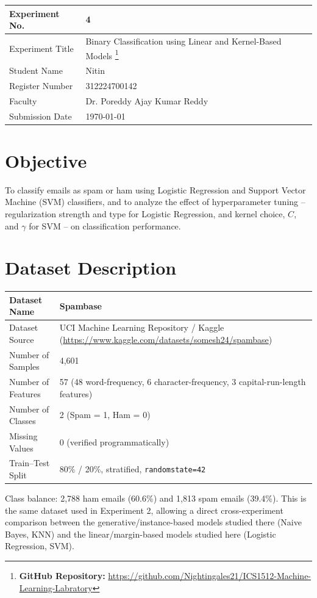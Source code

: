 \documentclass[12pt,a4paper]{article}
\DeclareRobustCommand{\_}{\textunderscore\allowbreak}
\begin{document}
\noindent\begin{tabular}{|p{4cm}|p{\dimexpr\linewidth-4cm-4\tabcolsep-3\arrayrulewidth\relax}|}
\hline
Experiment No. & 4 \\ \hline
Experiment Title & Binary Classification using Linear and Kernel-Based Models
\footnote{\textbf{GitHub Repository: }\url{https://github.com/Nightingales21/ICS1512-Machine-Learning-Labratory}}\\ \hline
Student Name & Nitin \\ \hline
Register Number & 312224700142 \\ \hline
Faculty & Dr. Poreddy Ajay Kumar Reddy \\ \hline
Submission Date & \today \\ \hline
\end{tabular}

\section{Objective}
To classify emails as spam or ham using Logistic Regression and Support
Vector Machine (SVM) classifiers, and to analyze the effect of
hyperparameter tuning -- regularization strength and type for Logistic
Regression, and kernel choice, $C$, and $\gamma$ for SVM -- on
classification performance.

\section{Dataset Description}
\begin{longtable}{|p{6cm}|p{8cm}|}
\hline
Dataset Name & Spambase \\ \hline
Dataset Source & UCI Machine Learning Repository / Kaggle
(\url{https://www.kaggle.com/datasets/somesh24/spambase}) \\ \hline
Number of Samples & 4{,}601 \\ \hline
Number of Features & 57 (48 word-frequency, 6 character-frequency, 3
capital-run-length features) \\ \hline
Number of Classes & 2 (Spam = 1, Ham = 0) \\ \hline
Missing Values & 0 (verified programmatically) \\ \hline
Train--Test Split & 80\% / 20\%, stratified, \texttt{random\_state=42} \\ \hline
\end{longtable}

Class balance: 2{,}788 ham emails (60.6\%) and 1{,}813 spam emails (39.4\%).
This is the same dataset used in Experiment 2, allowing a direct
cross-experiment comparison between the generative/instance-based models
studied there (Naive Bayes, KNN) and the linear/margin-based models studied
here (Logistic Regression, SVM).
\end{document}
